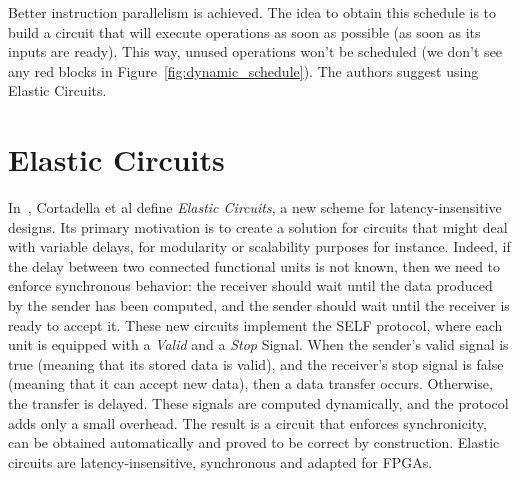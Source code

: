 \documentclass{article}
\begin{document}
Better instruction parallelism is achieved. The idea to obtain this schedule is to build a circuit that will execute operations as soon as possible (as soon as its inputs are ready). This way, unused operations won't be scheduled (we don't see any red blocks in Figure~\ref{fig:dynamic_schedule}). The authors suggest using Elastic Circuits.

\section{Elastic Circuits}

In~\cite{DBLP:conf/dac/CortadellaKG06}, Cortadella et al define \textit{Elastic Circuits}, a new scheme for latency-insensitive designs.
Its primary motivation is to create a solution for circuits that might deal with variable delays, for modularity or scalability purposes for instance.
Indeed, if the delay between two connected functional units is not known, then we need to enforce synchronous behavior: the receiver should wait until the data produced by the sender has been computed, and the sender should wait until the receiver is ready to accept it.
These new circuits implement the SELF protocol, where each unit is equipped with a \textit{Valid} and a \textit{Stop} Signal. When the sender's valid signal is true (meaning that its stored data is valid), and the receiver's stop signal is false (meaning that it can accept new data), then a data transfer occurs. Otherwise, the transfer is delayed. These signals are computed dynamically, and the protocol adds only a small overhead. The result is a circuit that enforces synchronicity, can be obtained automatically and proved to be correct by construction. Elastic circuits are latency-insensitive, synchronous and adapted for FPGAs.
\end{document}
